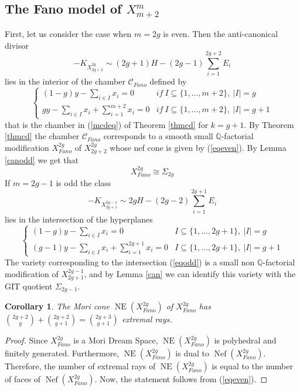 \documentclass[a4paper,10pt]{amsart}
\newtheorem{Corollary}[thm]{Corollary}
\theoremstyle{definition}
\DeclareMathOperator{\NE}{NE}
\DeclareMathOperator{\Nef}{Nef}
\begin{document}
\subsection{The Fano model of $X_{m+2}^m$}\label{FanoMod}
First, let us consider the case when $m = 2g$ is even. Then the anti-canonical divisor
$$-K_{X_{2g+2}^{2g}} \sim (2g+1)H-(2g-1)\sum_{i=1}^{2g+2}E_i$$
lies in the interior of the chamber $\mathcal{C}_{Fano}$ defined by 
\begin{equation}\label{eqeven}
\left\{
\begin{array}{ll}
(1-g)y-\sum_{i\in I}x_i=0 & if\ I\subseteq \{1,\dots,m+2\}, \: |I|=g\\ 
gy-\sum_{i\in I}x_i+\sum_{i=1}^{m+2}x_i=0 & if\ I\subseteq \{1,\dots,m+2\}, \: |I|=g+1
\end{array}  
\right.
\end{equation}
that is the chamber in (\ref{mcdeq}) of Theorem \ref{thmcd} for $k = g+1$. By Theorem \ref{thmcd} the chamber $\mathcal{C}_{Fano}$ corresponds to a smooth small $\mathbb{Q}$-factorial modification $X_{Fano}^{2g}$ of $X_{2g+2}^{2g}$ whose nef cone is given by (\ref{eqeven}). By Lemma \ref{canodd} we get that 
\begin{equation}\label{GITFano}
X_{Fano}^{2g} \cong \Sigma_{2g}
\end{equation}
If $m = 2g-1$ is odd the class
$$-K_{X_{2g+1}^{2g-1}} \sim 2gH-(2g-2)\sum_{i=1}^{2g+1}E_i$$
lies in the intersection of the hyperplanes
\begin{equation}\label{eqodd}
\left\{
\begin{array}{ll}
(1-g)y-\sum_{i\in I}x_i=0 & I\subseteq \{1,\dots,2g+1\}, \: |I|=g\\ 
(g-1)y-\sum_{i\in I}x_i+\sum_{i=1}^{2g+1}x_i=0 & I\subseteq \{1,\dots,2g+1\}, \: |I|=g+1
\end{array}  
\right.
\end{equation}
The variety corresponding to the intersection (\ref{eqodd}) is a small non $\mathbb{Q}$-factorial modification of $X_{2g+1}^{2g-1}$, and by Lemma \ref{can} we can identify this variety with the GIT quotient $\Sigma_{2g-1}$.

\begin{Corollary}\label{numexrays}
The Mori cone $\NE(X_{Fano}^{2g})$ of $X_{Fano}^{2g}$ has $\binom{2g+2}{g}+\binom{2g+2}{g+1}= \binom{2g+3}{g+1}$ extremal rays.
\end{Corollary}
\begin{proof}
Since $X_{Fano}^{2g}$ is a Mori Dream Space, $\NE(X_{Fano}^{2g})$ is polyhedral and finitely generated. Furthermore, $\NE(X_{Fano}^{2g})$ is dual to $\Nef(X_{Fano}^{2g})$. Therefore, the number of extremal rays of $\NE(X_{Fano}^{2g})$ is equal to the number of faces of $\Nef(X_{Fano}^{2g})$. Now, the statement follows from (\ref{eqeven}).
\end{proof}
\end{document}
